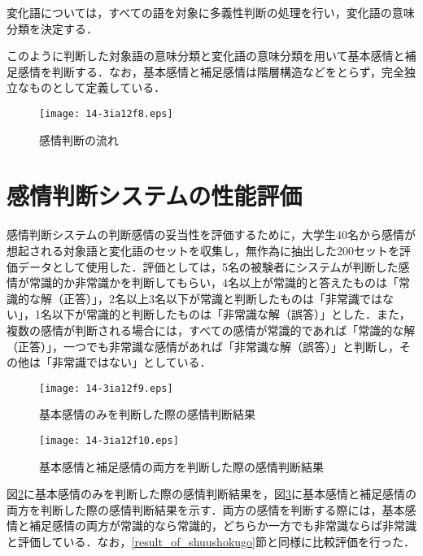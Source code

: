 \documentclass[japanese]{jnlp_1.3a}
\begin{document}
変化語については，すべての語を対象に多義性判断の処理を行い，変化語の意味分類を決定する．

このように判断した対象語の意味分類と変化語の意味分類を用いて基本感情と補足感情を判断する．なお，基本感情と補足感情は階層構造などをとらず，完全独立なものとして定義している．


\begin{figure}[t]
\begin{center}
    \texttt{[image: 14-3ia12f8.eps]}
\end{center}
\caption{感情判断の流れ}
\label{flow_of_emotion_generation}
\end{figure}



\section{感情判断システムの性能評価}\label{result_of_emotion_judgement_system}
感情判断システムの判断感情の妥当性を評価するために，大学生40名から感情が想起される対象語と変化語のセットを収集し，無作為に抽出した200セットを評価データとして使用した．評価としては，5名の被験者にシステムが判断した感情が常識的か非常識かを判断してもらい，4名以上が常識的と答えたものは「常識的な解（正答）」，2名以上3名以下が常識と判断したものは「非常識ではない」，1名以下が常識的と判断したものは「非常識な解（誤答）」とした．また，複数の感情が判断される場合には，すべての感情が常識的であれば「常識的な解（正答）」，一つでも非常識な感情があれば「非常識な解（誤答）」と判断し，その他は「非常識ではない」としている．

\begin{figure}[b]
\begin{center}
    \texttt{[image: 14-3ia12f9.eps]}
\end{center}
\caption{基本感情のみを判断した際の感情判断結果}
\label{result_of_base_emotion_judgement}
\end{figure}

\begin{figure}[b]
\begin{center}
    \texttt{[image: 14-3ia12f10.eps]}
\end{center}
\caption{基本感情と補足感情の両方を判断した際の感情判断結果}
\label{result_of_supplementation_emotion_judgement}
\end{figure}

図\ref{result_of_base_emotion_judgement}に基本感情のみを判断した際の感情判断結果を，図\ref{result_of_supplementation_emotion_judgement}に基本感情と補足感情の両方を判断した際の感情判断結果を示す．両方の感情を判断する際には，基本感情と補足感情の両方が常識的なら常識的，どちらか一方でも非常識ならば非常識と評価している．なお，\ref{result_of_shuushokugo}節と同様に比較評価を行った．
\end{document}
